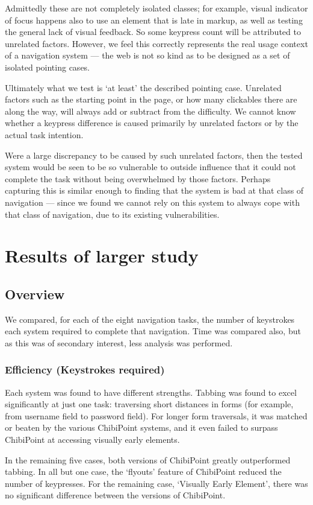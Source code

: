 \documentclass[11pt,openright,a4paper]{report}
\begin{document}
Admittedly these are not completely isolated classes; for example, visual indicator of focus happens also to use an element that is late in markup, as well as testing the general lack of visual feedback. So some keypress count will be attributed to unrelated factors. However, we feel this correctly represents the real usage context of a navigation system --- the web is not so kind as to be designed as a set of isolated pointing cases.

Ultimately what we test is `at least' the described pointing case. Unrelated factors such as the starting point in the page, or how many clickables there are along the way, will always add or subtract from the difficulty. We cannot know whether a keypress difference is caused primarily by unrelated factors or by the actual task intention.

Were a large discrepancy to be caused by such unrelated factors, then the tested system would be seen to be so vulnerable to outside influence that it could not complete the task without being overwhelmed by those factors. Perhaps capturing this is similar enough to finding that the system is bad at that class of navigation --- since we found we cannot rely on this system to always cope with that class of navigation, due to its existing vulnerabilities.

\chapter{Results of larger study}
\section{Overview}
We compared, for each of the eight navigation tasks, the number of keystrokes each system required to complete that navigation. Time was compared also, but as this was of secondary interest, less analysis was performed.
\subsection{Efficiency (Keystrokes required)}
Each system was found to have different strengths. Tabbing was found to excel significantly at just one task: traversing short distances in forms (for example, from username field to password field). For longer form traversals, it was matched or beaten by the various ChibiPoint systems, and it even failed to surpass ChibiPoint at accessing visually early elements.

In the remaining five cases, both versions of ChibiPoint greatly outperformed tabbing. In all but one case, the `flyouts' feature of ChibiPoint reduced the number of keypresses. For the remaining case, `Visually Early Element', there was no significant difference between the versions of ChibiPoint.
\end{document}
